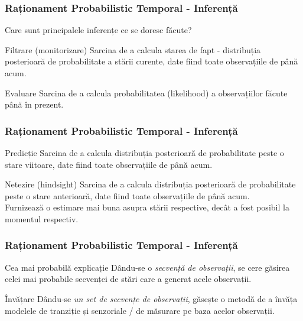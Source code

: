 \begin{frame}
  \frametitle{Raționament Probabilistic Temporal - Inferență}
	Care sunt principalele inferențe ce se doresc făcute?	
	\pause	
	
	\begin{block}{Filtrare (monitorizare)}
		Sarcina de a calcula \alert{starea de fapt} - distribuția posterioară de probabilitate a 
		\alert{stării curente}, date fiind toate observațiile de până acum.
	\end{block}
	\pause
	
	\begin{block}{Evaluare}
		Sarcina de a calcula \alert{probabilitatea (likelihood)} a observațiilor făcute până în prezent.
	\end{block}  
\end{frame}

\begin{frame}
  \frametitle{Raționament Probabilistic Temporal - Inferență}
	\begin{block}{Predicție}
		Sarcina de a calcula distribuția posterioară de probabilitate peste o \alert{stare viitoare}, 
		date fiind toate observațiile de până acum.
	\end{block}
	\pause
	
	\begin{block}{Netezire (hindsight)}
		Sarcina de a calcula distribuția posterioară de probabilitate peste o \alert{stare anterioară}, 
		date fiind toate observațiile de până acum.\\
		Furnizează o estimare mai buna asupra stării respective, decât a fost posibil la momentul respectiv.
	\end{block}
\end{frame}

\begin{frame}
  \frametitle{Raționament Probabilistic Temporal - Inferență}
	\begin{block}{Cea mai probabilă explicație}
		Dându-se o \emph{secvență de observații}, se cere găsirea \alert{celei mai probabile secvenței de stări}
		care a generat acele observații.
	\end{block}
	\pause
	
	\begin{block}{Învățare}
		Dându-se \emph{un set de secvențe de observații}, găsește o metodă de a învăța \alert{modelele} de
		\alert{tranziție} și \alert{senzoriale / de măsurare} pe baza acelor observații.
	\end{block}
\end{frame}

